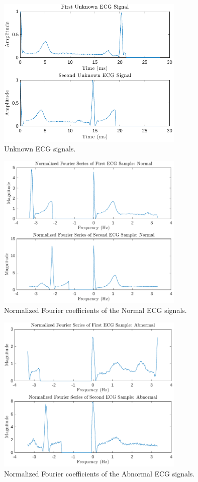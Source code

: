 \documentclass{zc-ust-hw}
\begin{document}
\begin{figure}[H]
  \centering
  \includegraphics[width=0.8\textwidth]{figures/Unknown_ECG_Signal.pdf}
  \caption{Unknown ECG signals.}
\end{figure}

\begin{figure}[H]
  \centering
  \includegraphics[width=0.8\textwidth]{figures/Fourier_Normal.pdf}
  \caption{Normalized Fourier coefficients of the Normal ECG signals.}
\end{figure}

\begin{figure}[H]
  \centering
  \includegraphics[width=0.8\textwidth]{figures/Fourier_Abnormal.pdf}
  \caption{Normalized Fourier coefficients of the Abnormal ECG signals.}
\end{figure}
\end{document}
